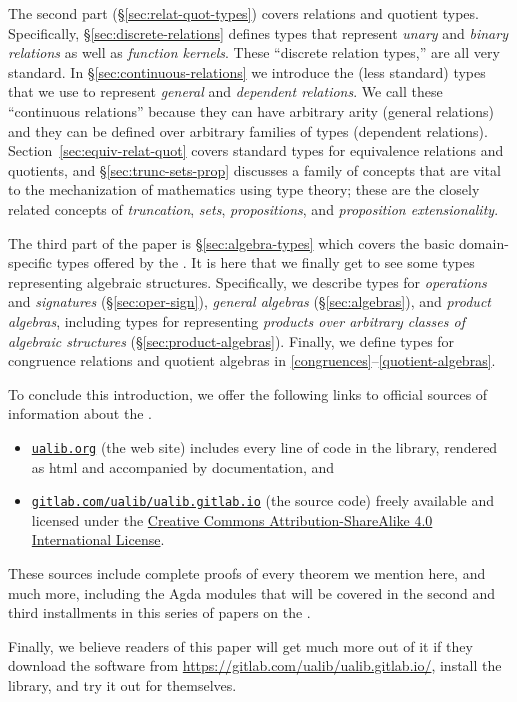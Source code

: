 The second part (\S\ref{sec:relat-quot-types}) covers relations and quotient types. Specifically, \S\ref{sec:discrete-relations} defines types that represent \emph{unary} and \emph{binary relations} as well as \emph{function kernels}. These ``discrete relation types,'' are all very standard.  In \S\ref{sec:continuous-relations} we introduce the (less standard) types that we use to represent \emph{general} and \emph{dependent relations}. We call these ``continuous relations'' because they can have arbitrary arity (general relations) and they can be defined over arbitrary families of types (dependent relations).
%
Section~\ref{sec:equiv-relat-quot} covers standard types for equivalence relations and quotients, and \S\ref{sec:trunc-sets-prop} discusses a family of concepts that are vital to the mechanization of mathematics using type theory; these are the closely related concepts of \emph{truncation}, \emph{sets}, \emph{propositions}, and \emph{proposition extensionality}.

The third part of the paper is \S\ref{sec:algebra-types} which covers the basic domain-specific types offered by the \ualib. It is here that we finally get to see some types representing algebraic structures.  Specifically, we describe types for \emph{operations} and \emph{signatures} (\S\ref{sec:oper-sign}), \emph{general algebras} (\S\ref{sec:algebras}), and \emph{product algebras}, including types for representing \emph{products over arbitrary classes of algebraic structures} (\S\ref{sec:product-algebras}). Finally, we define types for congruence relations and quotient algebras in \SS\ref{congruences}--\ref{quotient-algebras}.

To conclude this introduction, we offer the following links to official sources of information about the \agdaualib.
\begin{itemize}
  \item \href{https://ualib.gitlab.io}{\texttt{ualib.org}} (the web site) includes every line of code in the library, rendered as html and accompanied by documentation, and
  \item \href{https://gitlab.com/ualib/ualib.gitlab.io}{\texttt{gitlab.com/ualib/ualib.gitlab.io}} (the source code) freely available and licensed under the \href{https://creativecommons.org/licenses/by-sa/4.0/}{Creative Commons Attribution-ShareAlike 4.0 International License}.
\end{itemize}
These sources include complete proofs of every theorem we mention here, and much more, including the Agda modules that will be covered in the second and third installments in this series of papers on the \ualib.

Finally, we believe readers of this paper will get much more out of it if they download the software from \url{https://gitlab.com/ualib/ualib.gitlab.io/}, install the library, and try it out for themselves.
